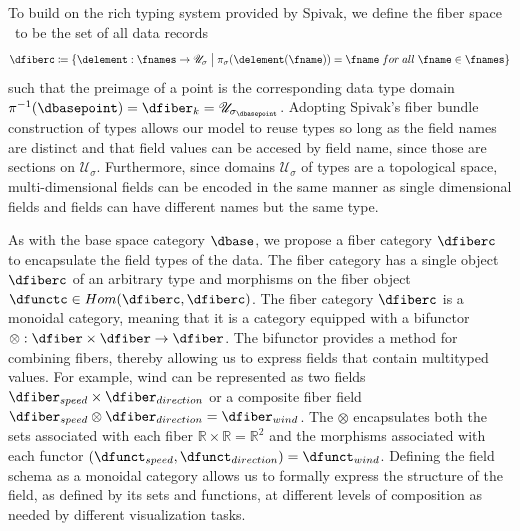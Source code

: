 \documentclass[10pt,journal,compsoc]{IEEEtran}
\theoremstyle{definition}
\theoremstyle{remark}
\begin{document}
To build on the rich typing system provided by Spivak, we define the \textcolor{fiber}{fiber space} \dfiberc\ to be the set of all data records
\begin{equation}
  \dfiberc \coloneqq \{\delement: \fnames \rightarrow \mathscr{U}_{\sigma} \bigm{\vert} \pi_{\sigma}(\delement(\fname)) = \fname\;for\;all\; \fname \in \fnames \}
\end{equation}
such that the preimage of a point is the corresponding data type domain $\pi^{-1}(\dbasepoint) = \dfiber_{k} = \mathscr{U}_{{\sigma}_{\dbasepoint}}$. 
Adopting Spivak's fiber bundle construction of types allows our model to reuse types so long as the field names are distinct and that field values can be accesed by field name,  since those are sections on $\mathcal{U}_{\sigma}$. Furthermore, since domains $\mathscr{U}_{{\sigma}}$ of types are a topological space, multi-dimensional fields can be encoded in the same manner as single dimensional fields and fields can have different names but the same type. 

As with the base space category $\mathcal{\dbase}$, we propose a fiber category $\mathcal{\dfiberc}$ to encapsulate the field types of the data. The fiber category has a single object $\dfiberc$ of an arbitrary type and morphisms on the fiber object $\dfunctc \in Hom(\dfiberc, \dfiberc)$. The fiber category $\mathcal{\dfiberc}$ is a monoidal category, meaning that it is a category equipped with a bifunctor $\otimes: \mathcal{\dfiber} \times \mathcal{\dfiber} \rightarrow \mathcal{\dfiber}$. The bifunctor provides a method for combining fibers, thereby allowing us to express fields that contain multityped values. For example, wind can be represented as two fields $\dfiber_{speed} \times \dfiber_{direction}$ or a composite fiber field $\dfiber_{speed} \otimes \dfiber_{direction} = \dfiber_{wind}$. The $\otimes$ encapsulates both the sets associated with each fiber $\mathbb{R} \times \mathbb{R} = \mathbb{R}^{2}$ and the morphisms associated with each functor $(\dfunct_{speed}, \dfunct_{direction}) = \dfunct_{wind}$. Defining the field schema as a monoidal category allows us to formally express the structure of the field, as defined by its sets and functions, at different levels of composition as needed by different visualization tasks.
 \
\end{document}

